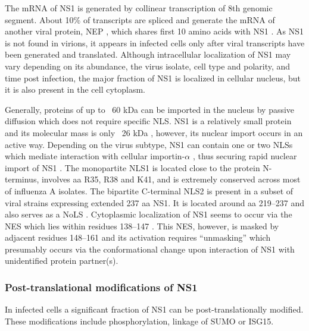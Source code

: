 		The mRNA of \gls{NS1} is generated by collinear transcription of 8th genomic segment. About 10\% of transcripts are spliced and generate the mRNA of another viral protein, \gls{NEP} \parencite{Lamb1980}, which shares first 10 amino acids with \gls{NS1} \parencite{Inglis1979, Lamb1979, Lamb1980}. As \gls{NS1} is not found in virions, it appears in infected cells only after viral transcripts have been generated and translated. Although intracellular localization of \gls{NS1} may vary depending on its abundance, the virus isolate, cell type and polarity, and time post infection, the major fraction of \gls{NS1} is localized in cellular nucleus, but it is also present in the cell cytoplasm\parencite{Melen2007, Melen2012, Newby2007, Li1998, Greenspan1988}. 
		
		Generally, proteins of up to ~60 kDa can be imported in the nucleus by passive diffusion \parencite{Macara2001, Wang2007} which does not require specific \gls{NLS}. \gls{NS1} is a relatively small protein and its molecular mass is only ~26 kDa \parencite{Ward1994}, however, its nuclear import occurs in an active way. Depending on the virus subtype, \gls{NS1} can contain one or two \gls{NLS}s which mediate interaction with cellular importin-$\alpha$ \parencite{Melen2007}, thus securing rapid nuclear import of \gls{NS1} \parencite{Privalsky1981}. The monopartite \gls{NLS}1 is located close to the protein N-terminus, involves aa R35, R38 and K41, and is extremely conserved across most of influenza A isolates. The bipartite C-terminal NLS2 is present in a subset of viral strains expressing extended 237 aa \gls{NS1}. It is located around aa 219--237 and also serves as a \gls{NoLS} \parencite{Melen2007, Melen2012}. Cytoplasmic localization of \gls{NS1} seems to occur via the \gls{NES} which lies within residues 138--147 \parencite{Li1998}. This \gls{NES}, however, is masked by adjacent residues 148--161 and its activation requires ``unmasking'' which presumably occurs via the conformational change upon interaction of \gls{NS1} with unidentified protein partner(s). 
		
		\subsubsection{Post-translational modifications of NS1}
		
		In infected cells a significant fraction of \gls{NS1} can be post-translationally modified. These modifications include phosphorylation, linkage of \gls{SUMO} or \gls{ISG15}.
		
